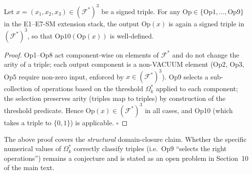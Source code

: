 \begin{lemma}\label{lem:op10-closure}
Let $x = (x_1,x_2,x_3)\in(\mathcal{F}^*)^3$ be a signed triple.
For any $\mathrm{Op}\in\{\mathrm{Op1},\ldots,\mathrm{Op9}\}$ in the E1--E7-SM
extension stack, the output $\mathrm{Op}(x)$ is again a signed triple in
$(\mathcal{F}^*)^3$, so that $\mathrm{Op10}(\mathrm{Op}(x))$ is well-defined.
\end{lemma}
\begin{proof}
Op1--Op8 act component-wise on elements of $\mathcal{F}^*$ and do not change
the arity of a triple; each output component is a non-VACUUM element
(Op2, Op3, Op5 require non-zero input, enforced by $x\in(\mathcal{F}^*)^3$).
Op9 selects a sub-collection of operations based on the threshold $\Omega_k^*$
applied to each component; the selection preserves arity (triples map to
triples) by construction of the threshold predicate.
Hence $\mathrm{Op}(x)\in(\mathcal{F}^*)^3$ in all cases, and Op10
(which takes a triple to $\{0,1\}$) is applicable. $\square$
\end{proof}
\begin{remark}
The above proof covers the \emph{structural} domain-closure claim.  Whether
the specific numerical values of $\Omega_k^*$ correctly classify triples
(i.e.\ Op9 ``selects the right operations'') remains a conjecture
and is stated as an open problem in Section~10 of the main text.
\end{remark}

